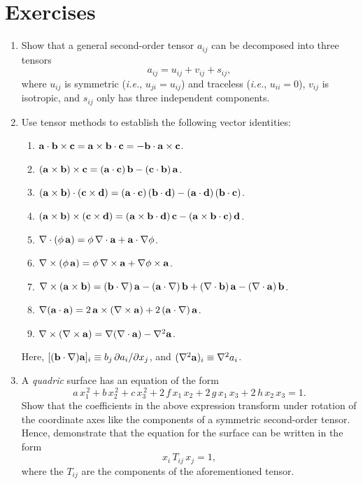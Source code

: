 \section{Exercises}
{\small 
\renewcommand{\theenumi}{B.\arabic{enumi}}
\begin{enumerate}
\item Show that a general second-order tensor $a_{ij}$ can be decomposed into three tensors
$$
a_{ij} = u_{ij} + v_{ij} + s_{ij},
$$
where $u_{ij}$ is symmetric ({\em i.e.}, $u_{ji}=u_{ij}$) and traceless ({\em i.e.}, $u_{ii}=0$), $v_{ij}$ is isotropic,
and $s_{ij}$ only has three independent components.

\item Use tensor methods to establish the following vector identities:
\begin{enumerate}
\item ${\bf a}\cdot{\bf b}\times {\bf c}={\bf a}\times {\bf b}\cdot{\bf c}=-{\bf b}\cdot{\bf a}\times{\bf c}$. 
\item $({\bf a}\times {\bf b})\times {\bf c} = ({\bf a}\cdot{\bf c})\,{\bf b} - ({\bf c}\cdot{\bf b})\,{\bf a}$.
\item $({\bf a}\times {\bf b})\cdot({\bf c}\times {\bf d})=
({\bf a}\cdot{\bf c})\,({\bf b}\cdot{\bf d}) - ({\bf a}\cdot{\bf d})\,({\bf b}\cdot{\bf c})$.
\item $({\bf a}\times {\bf b})\times ({\bf c}\times {\bf d})= ({\bf a}\times
{\bf b}\cdot{\bf d})\,{\bf c} - ({\bf a}\times {\bf b}\cdot{\bf c})\,{\bf d}$.
\item $\nabla\cdot(\phi\,{\bf a}) = \phi\,\nabla\cdot {\bf a} + {\bf a}\cdot\nabla \phi$. 
\item $\nabla\times (\phi\,{\bf a})= \phi\,\nabla\times {\bf a} + \nabla\phi\times {\bf a}$.
\item $\nabla\times({\bf a}\times {\bf b}) = ({\bf b}\cdot\nabla)\,{\bf a} - ({\bf a}\cdot\nabla)\,{\bf b} + (\nabla\cdot {\bf b})\,{\bf a}
-(\nabla\cdot{\bf a})\,{\bf b}$. 
\item $\nabla ({\bf a}\cdot{\bf a}) = 2\,{\bf a}\times (\nabla\times{\bf a}) + 2\,({\bf a}\cdot\nabla)\,{\bf a}$.
\item $\nabla\times(\nabla\times {\bf a}) = \nabla(\nabla\cdot{\bf a}) - \nabla^2 {\bf a}$.
\end{enumerate}
Here, $[({\bf b}\cdot{\nabla}){\bf a}]_i\equiv b_j\,\partial a_i/\partial x_j$, and $(\nabla^2 {\bf a})_i \equiv \nabla^2 a_i$. 

\item A {\em quadric}\/ surface has an equation of the form
$$
a\,x_1^{\,2} + b\,x_2^{\,2}+c\,x_3^{\,2} + 2\,f\,x_1\,x_2+2\,g\,x_1\,x_3+2\,h\,x_2\,x_3=1.
$$
Show that the coefficients in the above expression transform under rotation of
the coordinate axes like the components of a symmetric second-order tensor. Hence, demonstrate that the equation for the surface can be written in the form
$$
x_i\,T_{ij}\,x_j = 1,
$$
where the $T_{ij}$ are the components of the aforementioned tensor.


\end{enumerate}}
